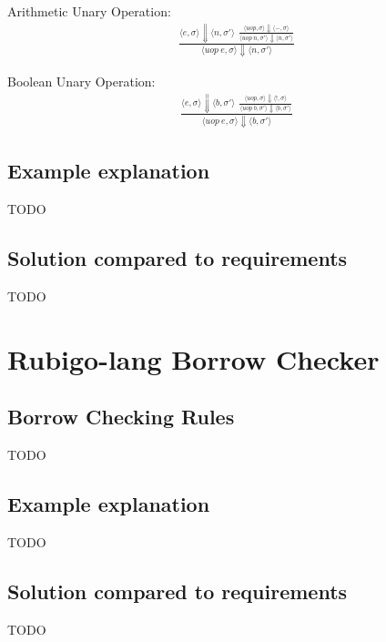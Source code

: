 \documentclass[12pt]{article}
\begin{document}
	Arithmetic Unary Operation:
	\begin{align*}
		\frac{
		\langle e, \sigma \rangle\Downarrow \langle n, \sigma' \rangle \ \ 
		\frac{
			\langle uop, \sigma \rangle\Downarrow \langle -, \sigma \rangle
		}{
			\langle uop\ n, \sigma' \rangle\Downarrow \langle n, \sigma' \rangle
		}}
		{\langle uop\ e, \sigma \rangle\Downarrow \langle n, \sigma' \rangle}
	\end{align*}


	Boolean Unary Operation:
	\begin{align*}
		\frac{
		\langle e, \sigma \rangle\Downarrow \langle b, \sigma' \rangle \ \ 
		\frac{
			\langle uop, \sigma \rangle\Downarrow \langle !, \sigma \rangle
		}{
			\langle uop\ b, \sigma' \rangle\Downarrow \langle b, \sigma' \rangle
		}}
		{\langle uop\ e, \sigma \rangle\Downarrow \langle b, \sigma' \rangle}
	\end{align*}

	

		


	\subsection{Example explanation}
 		TODO
    	
	\subsection{Solution compared to requirements}
 		TODO
    




    \section{Rubigo-lang Borrow Checker}	
    	\subsection{Borrow Checking Rules}
 		TODO

	\subsection{Example explanation}
 		TODO
    	
	\subsection{Solution compared to requirements}
 		TODO
\end{document}
